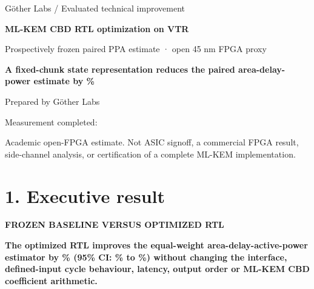 \documentclass[10pt,a4paper]{article}
\newcommand{\smallcaps}[1]{\textcolor{Mid}{\fontsize{8.5}{10}\selectfont\bfseries\MakeUppercase{#1}}}
\newcommand{\newpageheading}[2]{\clearpage\section{#1}\smallcaps{#2}\vspace{6pt}}
\begin{document}
\thispagestyle{empty}
\vspace*{47mm}
{\color{Mid}\fontsize{11}{14}\selectfont Göther Labs / Evaluated technical improvement}\par
\vspace{5mm}
{\color{Ink}\fontsize{29}{33}\selectfont\bfseries ML-KEM CBD RTL optimization on VTR}\par
\vspace{5mm}
{\color{Mid}\fontsize{13}{16}\selectfont Prospectively frozen paired PPA estimate · open 45 nm FPGA proxy}\par
\vspace{19mm}
\begin{claimbox}
{\fontsize{15}{19}\selectfont\bfseries A fixed-chunk state representation reduces the paired area-delay-power estimate by \CompositeImprovement\%}
\end{claimbox}
\vspace{35mm}
{\color{Mid}\fontsize{12}{15}\selectfont Prepared by Göther Labs}\par
\vspace{4mm}
{\color{Mid}\fontsize{12}{15}\selectfont Measurement completed: \EvidenceDate}\par
\vfill
{\color{Mid}\footnotesize Academic open-FPGA estimate. Not ASIC signoff, a commercial FPGA result, side-channel analysis, or certification of a complete ML-KEM implementation.}\par

\newpageheading{1. Executive result}{Frozen baseline versus optimized RTL}

\begin{claimbox}
\textbf{The optimized RTL improves the equal-weight area-delay-active-power estimator by \CompositeImprovement\% (95\% CI: \CompositeLow\% to \CompositeHigh\%) without changing the interface, defined-input cycle behaviour, latency, output order or ML-KEM CBD coefficient arithmetic.}
\end{claimbox}
\end{document}
